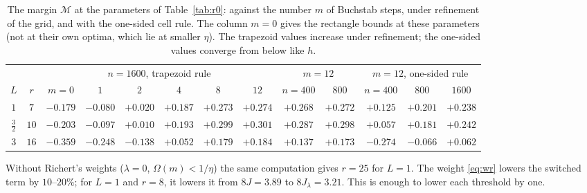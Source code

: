 \documentclass[11pt]{amsart}
\theoremstyle{remark}
\begin{document}
\begin{table}[htbp]
\centering\small\setlength{\tabcolsep}{3.5pt}
\begin{tabular}{cc|cccccc|cc|ccc}
\toprule
& & \multicolumn{6}{c|}{$n=1600$, trapezoid rule} & \multicolumn{2}{c|}{$m=12$} & \multicolumn{3}{c}{$m=12$, one-sided rule}\\
$L$ & $r$ & $m=0$ & $1$ & $2$ & $4$ & $8$ & $12$ & $n=400$ & $800$ & $n=400$ & $800$ & $1600$\\
\midrule
$1$ & $7$ & $-0.179$ & $-0.080$ & $+0.020$ & $+0.187$ & $+0.273$ & $+0.274$ & $+0.268$ & $+0.272$ & $+0.125$ & $+0.201$ & $+0.238$\\
$\frac32$ & $10$ & $-0.203$ & $-0.097$ & $+0.010$ & $+0.193$ & $+0.299$ & $+0.301$ & $+0.287$ & $+0.298$ & $+0.057$ & $+0.181$ & $+0.242$\\
$3$ & $16$ & $-0.359$ & $-0.248$ & $-0.138$ & $+0.052$ & $+0.179$ & $+0.184$ & $+0.137$ & $+0.173$ & $-0.274$ & $-0.066$ & $+0.062$\\
\bottomrule
\end{tabular}
\caption{The margin $\mathcal M$ at the parameters of Table~\ref{tab:r0}: against the number $m$ of Buchstab steps, under refinement of the grid, and with the one-sided cell rule. The column $m=0$ gives the rectangle bounds at these parameters (not at their own optima, which lie at smaller $\eta$). The trapezoid values increase under refinement; the one-sided values converge from below like $h$.}
\label{tab:iter}
\end{table}

Without Richert's weights ($\lambda=0$, $\Omega(m)<1/\eta$) the same computation gives $r=25$ for $L=1$. The weight \eqref{eq:wr} lowers the switched term by $10$--$20\%$; for $L=1$ and $r=8$, it lowers it from $8J=3.89$ to $8J_\lambda=3.21$. This is enough to lower each threshold by one.
\end{document}
